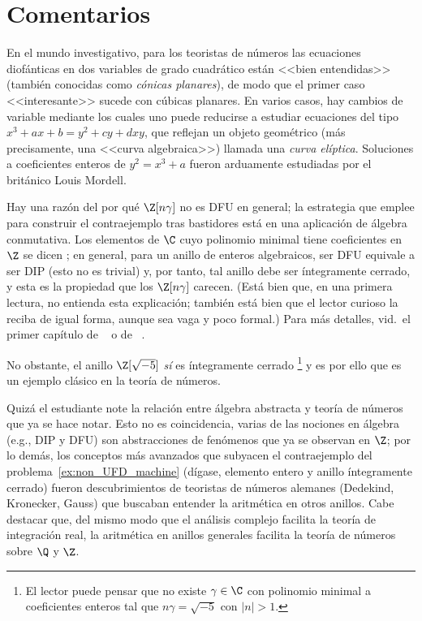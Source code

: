 \documentclass[11pt, reqno]{amsart}
\begin{document}
\section*{Comentarios}
En el mundo investigativo, para los teoristas de números las ecuaciones diofánticas en dos variables de grado cuadrático están <<bien
entendidas>> (también conocidas como \emph{cónicas planares}), de modo que el primer caso <<interesante>> sucede con cúbicas planares.
En varios casos, hay cambios de variable mediante los cuales uno puede reducirse a estudiar ecuaciones del tipo $x^3 + ax + b = y^2 + cy +
dxy$, que reflejan un objeto geométrico (más precisamente, una <<curva algebraica>>) llamada una \emph{curva elíptica}.
Soluciones a coeficientes enteros de $y^2 = x^3 + a$ fueron arduamente estudiadas por el británico Louis Mordell.

Hay una razón del por qué $\Z[n \gamma]$ no es DFU en general; la estrategia que emplee para construir el contraejemplo tras bastidores está
en una aplicación de álgebra conmutativa.
Los elementos de $\C$ cuyo polinomio minimal tiene coeficientes en $\Z$ se dicen ;
en general, para un anillo de enteros algebraicos, ser DFU equivale a ser DIP (esto no es trivial) y, por tanto, tal anillo debe ser
íntegramente cerrado, y esta es la propiedad que los $\Z[n \gamma]$ carecen.
(Está bien que, en una primera lectura, no entienda esta explicación; también está bien que el lector curioso la reciba de igual forma,
aunque sea vaga y poco formal.)
Para más detalles, vid.\ el primer capítulo de \citeauthor{janusz:algebraic}~\cite{janusz:algebraic} o de
\citeauthor{matsumura:ring}~\cite{matsumura:ring}.

No obstante, el anillo $\Z[\sqrt{-5}]$ \emph{sí} es íntegramente cerrado%
\footnote{El lector puede pensar que no existe $\gamma \in \C$ con polinomio minimal a coeficientes enteros tal que $n \gamma = \sqrt{-5}$
con $|n| > 1$.}
y es por ello que es un ejemplo clásico en la teoría de números.

Quizá el estudiante note la relación entre álgebra abstracta y teoría de números que ya se hace notar.
Esto no es coincidencia, varias de las nociones en álgebra (e.g., DIP y DFU) son abstracciones de fenómenos que ya se observan en $\Z$;
por lo demás, los conceptos más avanzados que subyacen el contraejemplo del problema~\ref{ex:non_UFD_machine} (dígase, elemento entero y
anillo íntegramente cerrado) fueron descubrimientos de teoristas de números alemanes (Dedekind, Kronecker, Gauss) que buscaban entender la
aritmética en otros anillos.
Cabe destacar que, del mismo modo que el análisis complejo facilita la teoría de integración real, la aritmética en anillos generales
facilita la teoría de números sobre $\Q$ y $\Z$.

\nocite{burton:elementary, andreescu:problems}
\printbibliography[title={Referencias y lecturas adicionales}]
\end{document}
